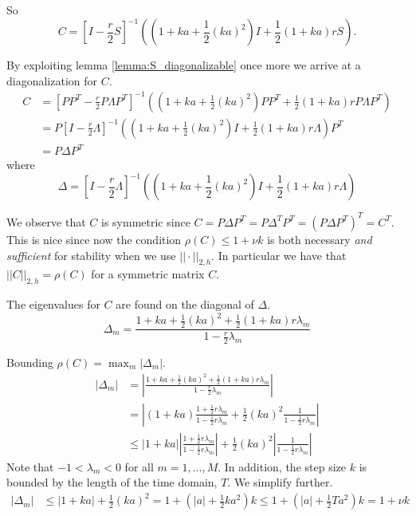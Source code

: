 So
\begin{equation}
    C = {\left[I - \frac{r}{2}S\right]}^{-1} \left( \left(1+ka+\frac{1}{2}(ka)^2\right)I + \frac{1}{2}\left(1+ka\right)rS\right).
  \end{equation}

By exploiting lemma \ref{lemma:S_diagonalizable} once more
we arrive at a diagonalization for \( C \).
\begin{align*}
  C &= {\left[PP^T - \frac{r}{2}P\Lambda P^T\right]}^{-1} \left( \left(1+ka+\frac{1}{2}(ka)^2\right)PP^T + \frac{1}{2}\left(1+ka\right)r P\Lambda P^T\right) \\
    &= P{\left[I - \frac{r}{2}\Lambda \right]}^{-1} \left( \left(1+ka+\frac{1}{2}(ka)^2\right)I + \frac{1}{2}\left(1+ka\right)r \Lambda \right) P^T \\
    &= P \Delta P^T
\end{align*}
where
\begin{equation}
    \Delta = {\left[I - \frac{r}{2}\Lambda \right]}^{-1} \left( \left(1+ka+\frac{1}{2}(ka)^2\right)I + \frac{1}{2}\left(1+ka\right)r \Lambda \right)
\end{equation}

We observe that \( C \) is symmetric
since \( C = P \Delta P^T = P \Delta^T P^T = \left(P \Delta P^T\right)^T = C^T \).
This is nice since now the condition
\( \rho(C) \le 1 + \nu k \) is
both necessary \textit{and} \textit{sufficient} for stability
when we use \( ||\cdot||_{2,h} \).
In particular we have that \( ||C||_{2,h} = \rho(C) \)
for a symmetric matrix \( C \).

The eigenvalues for \( C \) are found on the diagonal of \( \Delta \).
\begin{equation}
  \Delta_m =
      \frac{1+ka+\frac{1}{2}(ka)^2 + \frac{1}{2}\left(1+ka\right)r \lambda_m}
      {1 - \frac{r}{2} \lambda_m}
\end{equation}

Bounding \( \rho(C) = \max_{m} \lvert \Delta_m \rvert \).
\begin{align*}
  \left\lvert \Delta_m \right\rvert &= 
\left\lvert \frac{1+ka+\frac{1}{2}(ka)^2 + \frac{1}{2}\left(1+ka\right)r \lambda_m}
{1 - \frac{r}{2} \lambda_m} \right\rvert \\
 &= 
 \left\lvert \left(1+ka\right)\frac{1+\frac{1}{2}r \lambda_m}{1 - \frac{1}{2}r \lambda_m} + \frac{1}{2}(ka)^2 \frac{1}{1 - \frac{1}{2}r \lambda_m} \right\rvert \\
 &\le \left\lvert 1+ka \right\rvert \left\lvert \frac{1+\frac{1}{2}r \lambda_m}{1 - \frac{1}{2}r \lambda_m} \right\rvert + \frac{1}{2}(ka)^2 \left\lvert\frac{1}{1 - \frac{1}{2}r \lambda_m} \right\rvert
\end{align*}
   Note that \( -1 < \lambda_m < 0  \) for all \( m = 1, \dots, M \).
   In addition, the step size \( k \) is bounded by the length of
   the time domain, \( T \).
  We simplify further.
\begin{align*}
 \left\lvert \Delta_m \right\rvert
 &\le \left\lvert 1 + ka \right\rvert + \frac{1}{2} (ka)^2
 = 1 + (\lvert a \rvert + \frac{1}{2}k a^2 )k
 \le 1 + (\lvert a \rvert + \frac{1}{2}T a^2)k
  = 1 + \nu k
\end{align*}

